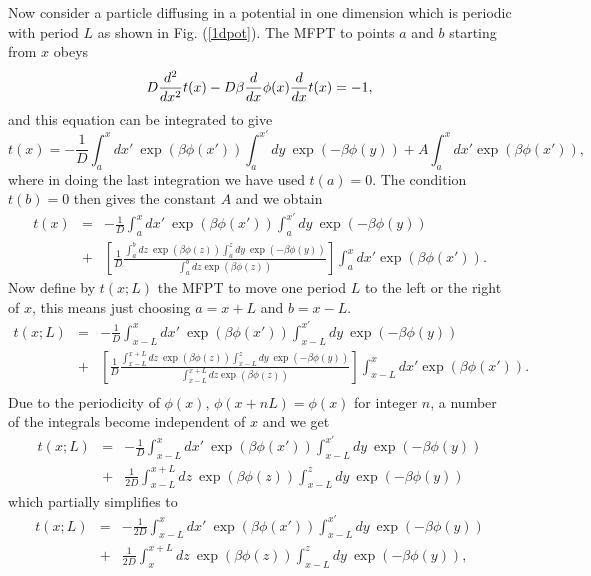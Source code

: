 \documentclass[11pt]{report}
\begin{document}
Now consider a particle diffusing in a potential in one dimension which is periodic with 
period $L$ as shown in Fig. (\ref{1dpot}). The MFPT to points $a$ and $b$ starting from $x$ obeys
\begin{equation}
D{d^2\over d x^2} t(x) - D\beta \frac{d}{d x}\phi(x) \frac{d}{d x}t(x) =-1,
\end{equation}
and this equation can be integrated to give
\begin{equation}
t(x) = -\frac{1}{D}\int_a^xdx'\ \exp\left(\beta\phi(x')\right)\int^{x'}_a dy\ \exp\left(-\beta
\phi(y)\right) + A\int_a^x dx' \exp\left(\beta\phi(x')\right),
\end{equation}
where in doing the last integration we have used $t(a)=0$. The condition $t(b)=0$ then gives the constant $A$ and we obtain
\begin{eqnarray}
t(x) &=& -\frac{1}{D}\int_a^xdx'\ \exp\left(\beta\phi(x')\right)\int^{x'}_a dy\ \exp\left(-\beta
\phi(y)\right) \nonumber \\ &+& \left[ \frac{1}{D} \frac{\int_a^bdz\ \exp\left(\beta\phi(z)\right)\int^{z}_a dy\ \exp\left(-\beta
\phi(y)\right)}{\int_a^b dz\exp\left(\beta\phi(z)\right)}\right]\int_a^x dx' \exp\left(\beta\phi(x')\right).
\end{eqnarray}
Now define by $t(x;L)$ the MFPT to move one period $L$ to the left or the right of $x$, this
means just choosing  $a=x+L$ and $b= x-L$. \begin{eqnarray}
t(x;L) &=& -\frac{1}{D}\int_{x-L}^{x}dx'\ \exp\left(\beta\phi(x')\right)\int^{x'}_{x-L} dy\ \exp\left(-\beta
\phi(y)\right) \nonumber \\ &+& \left[ \frac{1}{D} \frac{\int_{x-L}^{x+L}dz\ \exp\left(\beta\phi(z)\right)\int^{z}_{x-L} dy\ \exp\left(-\beta
\phi(y)\right)}{\int_{x-L}^{x+L} dz\exp\left(\beta\phi(z)\right)}\right]\int_{x-L}^x dx' \exp\left(\beta\phi(x')\right).\nonumber \\
\end{eqnarray}
Due to the periodicity of $\phi(x)$, $\phi(x+n L) = \phi(x)$ for integer $n$, a number of the 
integrals become independent of $x$ and we get
\begin{eqnarray}
t(x;L) &=& -\frac{1}{D}\int_{x-L}^{x}dx'\ \exp\left(\beta\phi(x')\right)\int^{x'}_{x-L} dy\ \exp\left(-\beta
\phi(y)\right) \nonumber \\ &+&  \frac{1}{2D} \int_{x-L}^{x+L}dz\ \exp\left(\beta\phi(z)\right)\int^{z}_{x-L} dy\ \exp\left(-\beta
\phi(y)\right)
\end{eqnarray}
which partially simplifies to
\begin{eqnarray}
t(x;L) &=& -\frac{1}{2D}\int_{x-L}^{x}dx'\ \exp\left(\beta\phi(x')\right)\int^{x'}_{x-L} dy\ \exp\left(-\beta
\phi(y)\right) \nonumber \\ &+&  \frac{1}{2D} \int_{x}^{x+L}dz\ \exp\left(\beta\phi(z)\right)\int^{z}_{x-L} dy\ \exp\left(-\beta
\phi(y)\right),\end{eqnarray}
\end{document}
